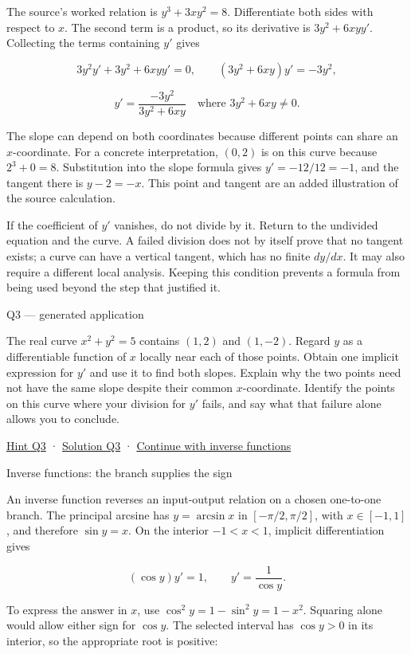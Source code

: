 \documentclass[
  11pt,
]{article}
\providecommand{\gt}{>}
\providecommand{\lt}{<}
\begin{document}
The source's worked relation is \(y^3+3xy^2=8\). Differentiate both
sides with respect to \(x\). The second term is a product, so its
derivative is \(3y^2+6xyy'\). Collecting the terms containing \(y'\)
gives

\[3y^2y'+3y^2+6xyy'=0,
\qquad
(3y^2+6xy)y'=-3y^2,\]

\[y'=\frac{-3y^2}{3y^2+6xy}
\quad\text{where }3y^2+6xy\ne0.\]

The slope can depend on both coordinates because different points can
share an \(x\)-coordinate. For a concrete interpretation, \((0,2)\) is
on this curve because \(2^3+0=8\). Substitution into the slope formula
gives \(y'=-12/12=-1\), and the tangent there is \(y-2=-x\). This point
and tangent are an added illustration of the source calculation.

If the coefficient of \(y'\) vanishes, do not divide by it. Return to
the undivided equation and the curve. A failed division does not by
itself prove that no tangent exists; a curve can have a vertical
tangent, which has no finite \(dy/dx\). It may also require a different
local analysis. Keeping this condition prevents a formula from being
used beyond the step that justified it.

Q3 --- generated application

The real curve \(x^2+y^2=5\) contains \((1,2)\) and \((1,-2)\). Regard
\(y\) as a differentiable function of \(x\) locally near each of those
points. Obtain one implicit expression for \(y'\) and use it to find
both slopes. Explain why the two points need not have the same slope
despite their common \(x\)-coordinate. Identify the points on this curve
where your division for \(y'\) fails, and say what that failure alone
allows you to conclude.

\protect\hyperlink{hint-q3}{Hint Q3} ·
\protect\hyperlink{solution-q3}{Solution Q3} ·
\protect\hyperlink{inverses}{Continue with inverse functions}

Inverse functions: the branch supplies the sign

An inverse function reverses an input-output relation on a chosen
one-to-one branch. The principal arcsine has \(y=\arcsin x\) in
\([-\pi/2,\pi/2]\), with \(x\in[-1,1]\), and therefore \(\sin y=x\). On
the interior \(-1\lt x\lt 1\), implicit differentiation gives

\[(\cos y)y'=1,\qquad y'=\frac1{\cos y}.\]

To express the answer in \(x\), use \(\cos^2y=1-\sin^2y=1-x^2\).
Squaring alone would allow either sign for \(\cos y\). The selected
interval has \(\cos y\gt 0\) in its interior, so the appropriate root is
positive:
\end{document}

